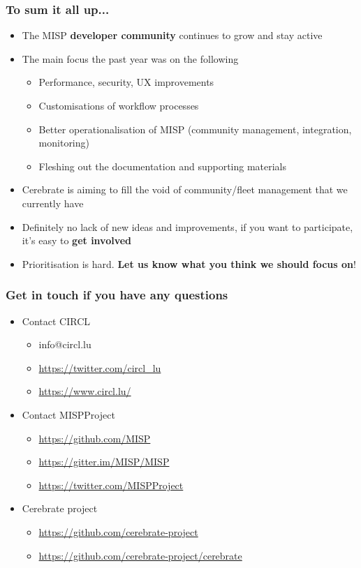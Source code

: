 \begin{frame}
  \frametitle{To sum it all up...}
  \begin{itemize}
     \item The MISP {\bf developer community} continues to grow and stay active
     \item The main focus the past year was on the following
     \begin{itemize}
          \item Performance, security, UX improvements
          \item Customisations of workflow processes
          \item Better operationalisation of MISP (community management, integration, monitoring)
          \item Fleshing out the documentation and supporting materials
     \end{itemize}
     \item Cerebrate is aiming to fill the void of community/fleet management that we currently have
     \item Definitely no lack of new ideas and improvements, if you want to participate, it's easy to {\bf get involved}
     \item Prioritisation is hard. {\bf Let us know what you think we should focus on}!
  \end{itemize}
\end{frame}

\begin{frame}
  \frametitle{Get in touch if you have any questions}
  \begin{itemize}
    \item Contact CIRCL
    \begin{itemize}
      \item info@circl.lu
      \item \url{https://twitter.com/circl_lu}
      \item \url{https://www.circl.lu/}
    \end{itemize}
    \item Contact MISPProject 
    \begin{itemize}
      \item \url{https://github.com/MISP}
      \item \url{https://gitter.im/MISP/MISP}
      \item \url{https://twitter.com/MISPProject}
    \end{itemize}
    \item Cerebrate project
    \begin{itemize}
      \item \url{https://github.com/cerebrate-project}
      \item \url{https://github.com/cerebrate-project/cerebrate}
    \end{itemize}
  \end{itemize}
\end{frame}

